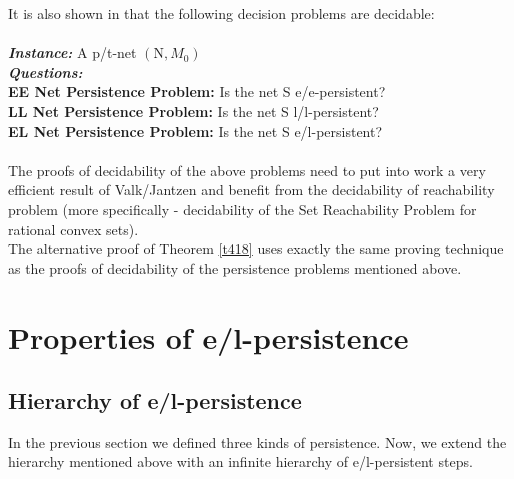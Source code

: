\documentclass[a4paper]{llncs}
\begin{document}
It is also shown in \cite{BarOch} that the following decision problems are decidable:
\\
\\
\textbf{\emph{Instance:}} A p/t-net $(\mathrm{N}, M_0)$ \\
\textbf{\emph{Questions:}}\\
\indent\textbf{EE Net Persistence Problem:} Is the net S e/e-persistent?\\
\indent\textbf{LL Net Persistence Problem:} Is the net S l/l-persistent?\\
\indent\textbf{EL Net Persistence Problem:} Is the net S e/l-persistent?\\
\\ 
\newpage
The proofs of decidability of the above problems need to put into work a very efficient result of Valk/Jantzen \cite{ValkJantzen} and benefit from the decidability of reachability problem (more specifically - decidability of the Set Reachability Problem for rational convex sets).
\\
The alternative proof of Theorem \ref{t418} uses exactly the same proving technique as the proofs of decidability of the persistence problems mentioned above.

\section{Properties of e/l-persistence}

\subsection{Hierarchy of e/l-persistence}

In the previous section we defined three kinds of persistence. Now, we extend the hierarchy mentioned above with an infinite hierarchy of e/l-persistent steps.
\end{document}
